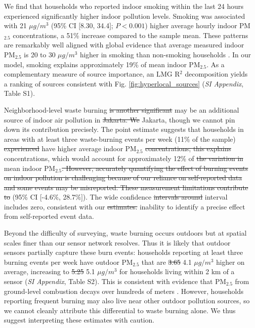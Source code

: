 \documentclass[9pt,twocolumn,twoside]{pnas-new}
\providecommand{\DIFadd}[1]{{\protect\color{red}#1}}
\providecommand{\DIFdel}[1]{{\protect\color{red}\protect\sout{#1}}}
\begin{document}
We find that households who reported indoor smoking within the last 24 hours experienced significantly higher indoor pollution levels. Smoking was associated with 21 $\mu g/m^3$ (95\% CI [8.30, 34.4]; $P < 0.001$) higher average hourly indoor PM$_{2.5}$ concentrations, a 51\% increase compared to the sample mean. These patterns are remarkably well aligned with global evidence that average measured indoor PM$_{2.5}$ is 20 to 30 $\mu g / m^3$ higher in smoking than non-smoking households \citep{Semple2015}. In our model, smoking explains approximately 19\% of mean indoor PM$_{2.5}$. As a complementary measure of source importance, an LMG R$^2$ decomposition yields a ranking of sources consistent with Fig. \ref{fig:hyperlocal_sources} (\textit{SI Appendix}, Table S1).

Neighborhood-level waste burning \DIFdel{is another significant} \DIFadd{may be an additional} source of indoor air pollution in \DIFdel{Jakarta. We} \DIFadd{Jakarta, though we cannot pin down its contribution precisely. 
The point} estimate \DIFadd{suggests} that households in areas with at least three waste-burning events per week (11\% of the sample) \DIFdel{experienced} \DIFadd{have} higher average indoor PM$_{2.5}$ \DIFdel{concentrations; this explains} \DIFadd{concentrations, which would account for} approximately 12\% of \DIFdel{the variation in} mean indoor PM$_{2.5}$\DIFdel{. However, accurately quantifying the effect of burning events on indoor pollution is challenging because of our reliance on self-reported data and some events may be misreported. These measurement limitations contribute to} \DIFadd{(95\% CI [-4.6\%, 28.7\%]).
The} wide confidence \DIFdel{intervals around} \DIFadd{interval includes zero, consistent with} our \DIFdel{estimates.} \DIFadd{inability to identify a precise effect from self-reported event data.}

Beyond the difficulty of surveying, waste burning occurs outdoors but at spatial scales finer than our sensor network resolves. Thus it is likely that outdoor sensors partially capture these burn events: households reporting at least three burning events per week have outdoor PM$_{2.5}$ that are \DIFdel{3.65} \DIFadd{4.1} $\mu g/m^3$ higher on average, increasing to \DIFdel{5.25} \DIFadd{5.1} $\mu g/m^3$ for households living within 2 km of a sensor (\textit{SI Appendix}, Table S2). This is consistent with evidence that PM$_{2.5}$ from ground-level combustion decays over hundreds of meters \citep{WHO2013REVIHAAP}. However, households reporting frequent burning may also live near other outdoor pollution sources, so we cannot cleanly attribute this differential to waste burning alone. We thus suggest interpreting these estimates with caution.
\end{document}
